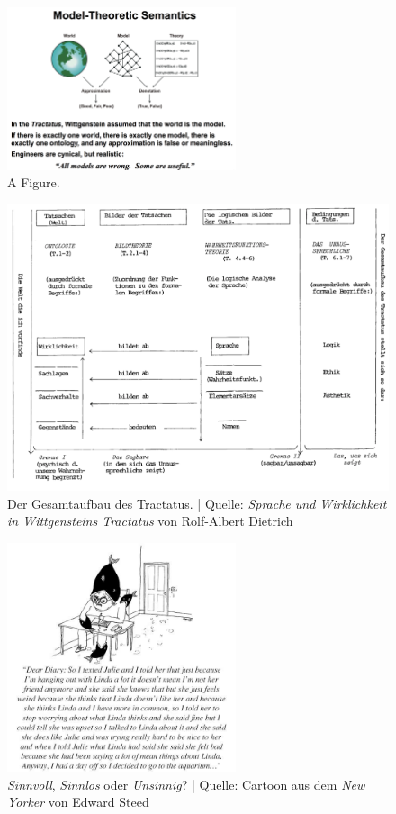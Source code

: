 \documentclass[emulatestandardclasses]{scrartcl}
\begin{document}
\begin{figure}[h]
	\centering
	\includegraphics[width=0.6\textwidth]{images/tractatus/semantics.png}
	\caption{A Figure.}
	\label{fig:sem}
\end{figure}
\begin{figure}[h]
	\centering
	\includegraphics[width=1\textwidth]{images/tractatus/tractatus-structur.png}
	\caption{Der Gesamtaufbau des Tractatus. | Quelle: \emph{Sprache und Wirklichkeit in Wittgensteins Tractatus} von Rolf-Albert Dietrich}
	\label{fig:struct}
\end{figure}
\begin{figure}[h]
	\centering
	\includegraphics[width=0.6\textwidth]{images/tractatus/newyorker}
	\caption{\emph{Sinnvoll}, \emph{Sinnlos} oder \emph{Unsinnig}? | Quelle: Cartoon aus dem \emph{New Yorker} von Edward Steed}
	\label{fig:newyorker}
\end{figure}
\end{document}
